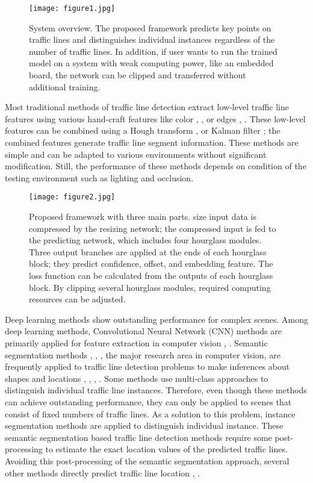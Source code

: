 \documentclass[journal]{IEEEtran}
\begin{document}
\begin{figure}
    \centering
    \texttt{[image: figure1.jpg]}
    \caption{System overview. The proposed framework predicts key points on traffic lines and distinguishes individual instances regardless of the number of traffic lines. In addition, if user wants to run the trained model on a system with weak computing power, like an embedded board, the network can be clipped and transferred without additional training.}
\end{figure}

Most traditional methods of traffic line detection extract low-level traffic line features using various hand-craft features like color \cite{1}, \cite{2}, or edges \cite{wang1998lane}, \cite{lee2018robust}. These low-level features can be combined using a Hough transform \cite{duda1972use}, \cite{9146381} or Kalman filter \cite{borkar2009robust}; the combined features generate traffic line segment information. These methods are simple and can be adapted to various environments without significant modification. Still, the performance of these methods depends on condition of the testing environment such as lighting and occlusion.

\begin{figure*}
    \centering
    \texttt{[image: figure2.jpg]}
    \caption{Proposed framework with three main parts.  size input data is compressed by the resizing network; the compressed input is fed to the predicting network, which includes four hourglass modules. Three output branches are applied at the ends of each hourglass block; they predict confidence, offset, and embedding feature. The loss function can be calculated from the outputs of each hourglass block. By clipping several hourglass modules, required computing resources can be adjusted.
}
\end{figure*}

Deep learning methods show outstanding performance for complex scenes. Among deep learning methods, Convolutional Neural Network (CNN) methods are primarily applied for feature extraction in computer vision \cite{krizhevsky2012imagenet}, \cite{he2017mask}. Semantic segmentation methods \cite{badrinarayanan2017segnet}, \cite{paszke2016enet}, \cite{ronneberger2015u}, the major research area in computer vision, are frequently applied to traffic line detection problems to make inferences about shapes and locations \cite{yang2019improved}, \cite{pan2018spatial}, \cite{van2019end}, \cite{zou2019robust}. Some methods use multi-class approaches to distinguish individual traffic line instances. Therefore, even though these methods can achieve outstanding performance, they can only be applied to scenes that consist of fixed numbers of traffic lines. As a solution to this problem, instance segmentation methods are applied to distinguish individual instance. These semantic segmentation based traffic line detection methods require some post-processing to estimate the exact location values of the predicted traffic lines. Avoiding this post-processing of the semantic segmentation approach, several other methods directly predict traffic line location \cite{chen2019pointlanenet}, \cite{8624563}. 
\end{document}
